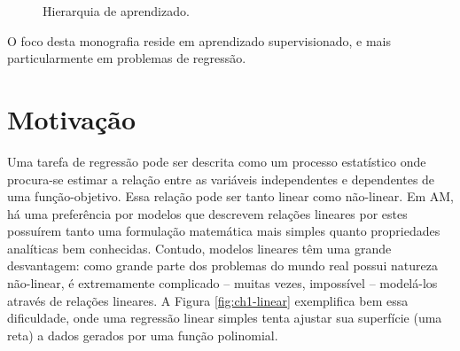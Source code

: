 \begin{figure}[H]
    \caption{Hierarquia de aprendizado.}
    \label{fig:ch1-1}
    \def\gap{13mm}
    \centering
    \begin{center}
    \end{center}
\end{figure}

O foco desta monografia reside em aprendizado supervisionado, e mais particularmente em problemas de regressão.

\section{Motivação}

Uma tarefa de regressão pode ser descrita como um processo estatístico onde procura-se estimar a relação entre as variáveis independentes e dependentes de uma função-objetivo. Essa relação pode ser tanto linear como não-linear. Em AM, há uma preferência por modelos que descrevem relações lineares por estes possuírem tanto uma formulação matemática mais simples quanto propriedades analíticas bem conhecidas. Contudo, modelos lineares têm uma grande desvantagem: como grande parte dos problemas do mundo real possui natureza não-linear, é extremamente complicado -- muitas vezes, impossível -- modelá-los através de relações lineares. A Figura \ref{fig:ch1-linear} exemplifica bem essa dificuldade, onde uma regressão linear simples tenta ajustar sua superfície (uma reta) a dados gerados por uma função polinomial.


